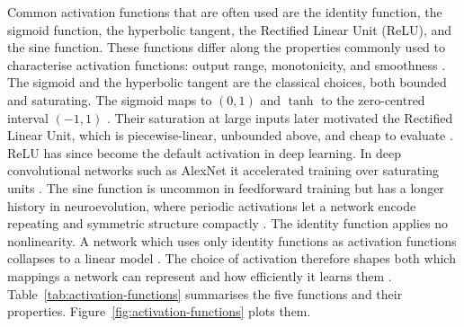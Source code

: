 Common activation functions that are often used are the identity function, the sigmoid function, the hyperbolic tangent, the Rectified Linear Unit (ReLU), and the sine function.
These functions differ along the properties commonly used to characterise activation functions: output range, monotonicity, and smoothness \parencite{dubey_activation_2022}.
The sigmoid and the hyperbolic tangent are the classical choices, both bounded and saturating. The sigmoid maps to $(0,1)$ and $\tanh$ to the zero-centred interval $(-1,1)$ \parencite{dubey_activation_2022}.
Their saturation at large inputs later motivated the Rectified Linear Unit, which is piecewise-linear, unbounded above, and cheap to evaluate \parencite{nair_rectified_2010}.
ReLU has since become the default activation in deep learning. In deep convolutional networks such as AlexNet it accelerated training over saturating units \parencite{krizhevsky_imagenet_2012,ramachandran_searching_2017}.
The sine function is uncommon in feedforward training but has a longer history in neuroevolution, where periodic activations let a network encode repeating and symmetric structure compactly \parencite{stanley_compositional_2007}.
The identity function applies no nonlinearity. A network which uses only identity functions as activation functions collapses to a linear model \parencite{dubey_activation_2022}.
The choice of activation therefore shapes both which mappings a network can represent and how efficiently it learns them \parencite{dubey_activation_2022}.
Table~\ref{tab:activation-functions} summarises the five functions and their properties. Figure~\ref{fig:activation-functions} plots them.

